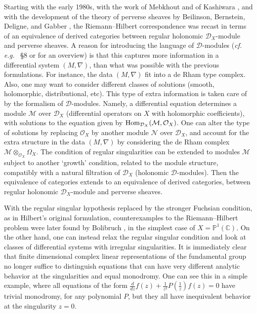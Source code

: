 \documentclass[10pt]{amsart}
\def\C{{\mathbb C}}
\renewcommand{\P}{{\mathbb P}}
\def\Dc{{\mathcal D}}
\def\Mc{{\mathcal M}}
\def\Nc{{\mathcal N}}
\def\Oc{{\mathcal O}}
\def\Hom{\mathop{\rm Hom}\nolimits}
\newcommand{\eg}{{\it e.g.\/}\ }
\newcommand{\cf}{{\it cf.\/}\ }
\numberwithin{equation}{section}
\begin{document}
Starting with the early 1980s, with  the work of Mebkhout \cite{Me1}
\cite{Me2} and of Kashiwara \cite{Ka1} \cite{Ka2}, and with the
development of the theory of perverse sheaves by Beilinson,
Bernstein, Deligne, and Gabber \cite{BBD},
the Riemann--Hilbert correspondence was
recast in terms of an equivalence of derived categories between
regular holonomic $\Dc_X$-module and perverse sheaves. A reason
for introducing the language of $\Dc$-modules (\cf
\eg \cite{GeMa} \S 8 or \cite{LM} for an overview) is that this
captures more information in a differential system
$(M,\nabla)$, than what was possible with the previous
formulations. For instance, the data
$(M,\nabla)$ fit into a de Rham type complex. Also, one may want to
consider different classes of solutions (smooth, holomorphic,
distributional, etc). This type of extra information is taken care of
by the formalism of $\Dc$-modules. Namely,
a differential equation determines a module $\Mc$ over $\Dc_X$
(differential operators on $X$ with holomorphic coefficients), with
solutions to the equation given
by $\Hom_{\Dc_X}(\Mc,\Oc_X)$. One can alter the type of solutions by
replacing $\Oc_X$ by another module $\Nc$ over $\Dc_X$, and account
for the extra structure in the data $(M,\nabla)$ by considering the de
Rham complex $\Mc \otimes_{\Oc_X} \Omega_X$. The condition of regular
singularities can be extended to modules $\Mc$ subject to another
`growth' condition, related to the module structure, compatibly with a
natural filtration of $\Dc_X$ (holonomic $\Dc$-modules). Then the
equivalence of categories extends to an equivalence of derived
categories, between regular holonomic $\Dc_X$-module and perverse
sheaves.

\smallskip

With the regular singular hypothesis replaced by the stronger
Fuchsian condition, as in Hilbert's original formulation,
counterexamples to the Riemann--Hilbert problem were later found by
Bolibruch \cite{Bol}, in the simplest case of $X=\P^1(\C)$.
On the other hand, one can instead relax the regular singular
condition and look at classes of differential systems with irregular
singularities. It is immediately clear that finite
dimensional complex linear representations of the fundamental group no
longer suffice to distinguish equations that can have very different
analytic behavior at the singularities and equal monodromy. One can
see this in a simple example, where all equations of the form
$\frac{d}{dz} f(z) + \frac{1}{z^2} P\left( \frac{1}{z} \right)f(z)
=0$ have trivial monodromy, for any polynomial $P$, but they all have
inequivalent behavior at the singularity $z=0$.
\end{document}
